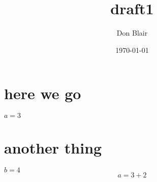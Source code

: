 \documentclass[11pt]{article}
\title{draft1}
\author{Don Blair}
\date{\today}
\begin{document}
\maketitle

\setcounter{tocdepth}{3}
\tableofcontents
\vspace*{1cm}
\section{here we go}
\label{sec-1}

$a=3$
\section{another thing}
\label{sec-2}

$b=4$
\begin{equation}
a=3+2
\end{equation}
\end{document}
